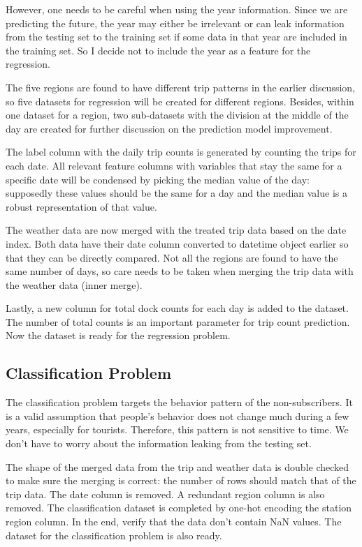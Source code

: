 \documentclass[a4paper]{article}
\begin{document}
		However, one needs to be careful when using the year information. Since we are predicting the future, the year may either be irrelevant or can leak information from the testing set to the training set if some data in that year are included in the training set. So I decide not to include the year as a feature for the regression. 
		
		The five regions are found to have different trip patterns in the earlier discussion, so five datasets for regression will be created for different regions. Besides, within one dataset for a region, two sub-datasets with the division at the middle of the day are created for further discussion on the prediction model improvement. 
		
		The label column with the daily trip counts is generated by counting the trips for each date. All relevant feature columns with variables that stay the same for a specific date will be condensed by picking the median value of the day: supposedly these values should be the same for a day and the median value is a robust representation of that value. 
		
		The weather data are now merged with the treated trip data based on the date index. Both data have their date column converted to datetime object earlier so that they can be directly compared. Not all the regions are found to have the same number of days, so care needs to be taken when merging the trip data with the weather data (inner merge).
		
		Lastly, a new column for total dock counts for each day is added to the dataset. The number of total counts is an important parameter for trip count prediction. Now the dataset is ready for the regression problem.
		
		\subsection{Classification Problem}
		The classification problem targets the behavior pattern of the non-subscribers. It is a valid assumption that people's behavior does not change much during a few years, especially for tourists. Therefore, this pattern is not sensitive to time. We don't have to worry about the information leaking from the testing set. 
		
		The shape of the merged data from the trip and weather data is double checked to make sure the merging is correct: the number of rows should match that of the trip data. The date column is removed. A redundant region column is also removed. The classification dataset is completed by one-hot encoding the station region column. In the end, verify that the data don't contain NaN values. The dataset for the classification problem is also ready.		
\end{document}
